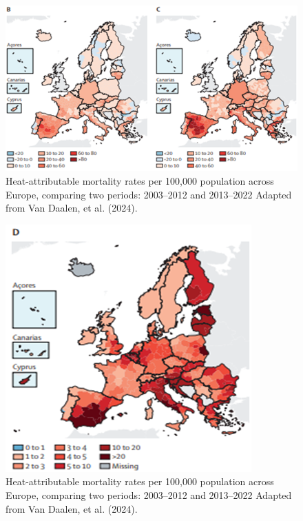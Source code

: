 \documentclass[
]{krantz}
\begin{document}
\begin{figure}
\includegraphics[width=1\linewidth]{1} \caption{Heat-attributable mortality rates per 100,000 population across Europe, comparing two periods: 2003–2012 and 2013–2022 Adapted from Van Daalen, et al. (2024).}\label{fig:heatmap-1}
\end{figure}
\begin{figure}
\includegraphics[width=1\linewidth]{2} \caption{Heat-attributable mortality rates per 100,000 population across Europe, comparing two periods: 2003–2012 and 2013–2022 Adapted from Van Daalen, et al. (2024).}\label{fig:heatmap-2}
\end{figure}
\end{document}
